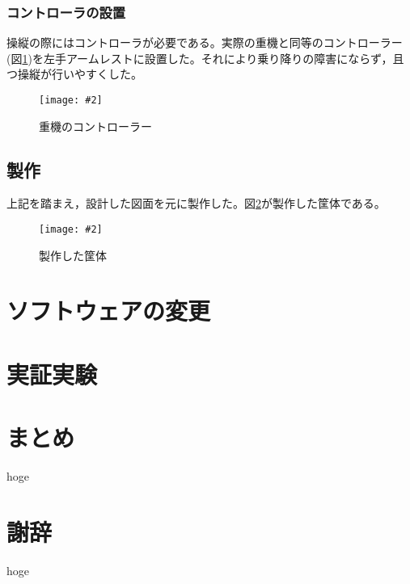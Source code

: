 \documentclass[10pt,a4paper]{jsarticle}
\newcommand{\figuref}[1]{図\ref{#1}}
\newcommand{\fig}[4][width=\textwidth]{
    \begin{figure}[!h]
    \begin{center}
    \texttt{[image: \#2]}
    \caption{#3}
    \label{#4}
    \vspace*{-1cm}
    \end{center}
    \end{figure}
}
\begin{document}
\subsubsection{コントローラの設置}
操縦の際にはコントローラが必要である。実際の重機と同等のコントローラー(\figuref{controller})を左手アームレストに設置した。それにより乗り降りの障害にならず，且つ操縦が行いやすくした。
\fig[width=9cm]{image/test_field.jpg}{重機のコントローラー}{controller}

\subsection{製作}
上記を踏まえ，設計した図面を元に製作した。\figuref{body}が製作した筐体である。
\fig[width=9cm]{image/test_field.jpg}{製作した筐体}{body}

\clearpage

\section{ソフトウェアの変更}

\clearpage

\section{実証実験}

\clearpage

\section{まとめ}
hoge

\clearpage

\section*{謝辞} %
hoge

\clearpage
\end{document}
